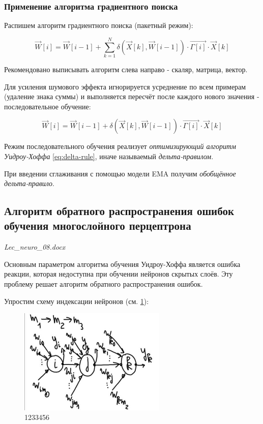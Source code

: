 \documentclass{article}
\begin{document}
\subsubsection{Применение алгоритма градиентного поиска}

Распишем алгоритм градиентного поиска (пакетный режим):

\begin{equation}
    \vec{W}[i] = \vec{W}[i-1] + \sum_{k=1}^{N} \delta(\vec{X}[k], \vec{W}[i-1])\cdot \vec{\Gamma[i]} \cdot \vec{X}[k]
\end{equation}

\begin{myquote}
    Рекомендовано выписывать алгоритм слева направо - скаляр, матрица, вектор.
\end{myquote}

Для усиления шумового эффекта игнорируется усреднение по всем примерам (удаление знака суммы) и выполняется 
пересчёт после каждого нового значения - последовательное обучение:

\begin{equation}
    \vec{W}[i] = \vec{W}[i-1] + \delta(\vec{X}[k], \vec{W}[i-1])\cdot \vec{\Gamma[i]} \cdot \vec{X}[k]
    \label{eq:delta-rule}
\end{equation}

Режим последовательного обучения реализует \textit{оптимизирующий алгоритм Уидроу-Хоффа} \ref{eq:delta-rule}, 
иначе называемый \textit{дельта-правилом}.

При введении сглаживания с помощью модели EMA получим \textit{обобщённое дельта-правило}.




\subsection{Алгоритм обратного распространения ошибок обучения многослойного перцептрона}

\begin{myquote}
    \textit{Lec\_neuro\_08.docx}
\end{myquote}

Основным параметром алгоритма обучения Уидроу-Хоффа является ошибка реакции, которая 
недоступна при обучении нейронов скрытых слоёв.
Эту проблему решает алгоритм обратного распространения ошибок.

Упростим схему индексации нейронов (см. \ref{hyperflat_10_1}):

\begin{figure}[htbp]
    \centering
    \includegraphics[width=7cm]{hyperflat_10_1.jpeg}
    \caption{1233456}
    \label{hyperflat_10_1}
\end{figure}
\end{document}

